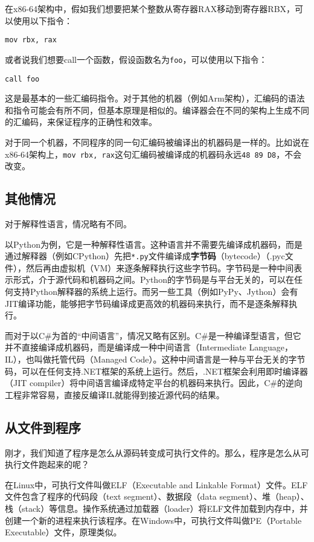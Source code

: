 \documentclass[../main.tex]{subfiles}
\begin{document}
在x86-64架构中，假如我们想要把某个整数从寄存器RAX移动到寄存器RBX，可以使用以下指令：
\begin{lstlisting}
mov rbx, rax
\end{lstlisting}
或者说我们想要call一个函数，假设函数名为\texttt{foo}，可以使用以下指令：
\begin{lstlisting}
call foo
\end{lstlisting}
这是最基本的一些汇编码指令。对于其他的机器（例如Arm架构），汇编码的语法和指令可能会有所不同，但基本原理是相似的。编译器会在不同的架构上生成不同的汇编码，来保证程序的正确性和效率。

对于同一个机器，不同程序的同一句汇编码被编译出的机器码是一样的。比如说在x86-64架构上，\texttt{mov rbx, rax}这句汇编码被编译成的机器码永远\texttt{48 89 D8}，不会改变。

\subsection{其他情况}

对于解释性语言，情况略有不同。

以Python为例，它是一种解释性语言。这种语言并不需要先编译成机器码，而是通过解释器（例如CPython）先把\texttt{*.py}文件编译成\textbf{字节码}（bytecode）（.pyc文件），然后再由虚拟机（VM）来逐条解释执行这些字节码。字节码是一种中间表示形式，介于源代码和机器码之间。Python的字节码是与平台无关的，可以在任何支持Python解释器的系统上运行。而另一些工具（例如PyPy、Jython）会有JIT编译功能，能够把字节码编译成更高效的机器码来执行，而不是逐条解释执行。

而对于以C\#为首的“中间语言”，情况又略有区别。C\#是一种编译型语言，但它并不直接编译成机器码，而是编译成一种中间语言（Intermediate Language，IL），也叫做托管代码（Managed Code）。这种中间语言是一种与平台无关的字节码，可以在任何支持.NET框架的系统上运行。然后，.NET框架会利用即时编译器（JIT compiler）将中间语言编译成特定平台的机器码来执行。因此，C\#的逆向工程非常容易，直接反编译IL就能得到接近源代码的结果。

\subsection{从文件到程序}

刚才，我们知道了程序是怎么从源码转变成可执行文件的。那么，程序是怎么从可执行文件跑起来的呢？

在Linux中，可执行文件叫做ELF（Executable and Linkable Format）文件。ELF文件包含了程序的代码段（text segment）、数据段（data segment）、堆（heap）、栈（stack）等信息。操作系统通过加载器（loader）将ELF文件加载到内存中，并创建一个新的进程来执行该程序。在Windows中，可执行文件叫做PE（Portable Executable）文件，原理类似。
\end{document}
